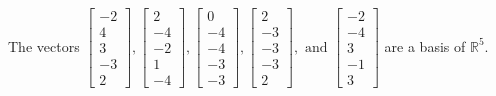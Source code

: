 \begin{exercise}
\begin{exerciseStatement}
  \end{exerciseStatement}
  \begin{exerciseAnswer}
   The vectors \(\left[\begin{array}{r}
-2 \\
4 \\
3 \\
-3 \\
2
\end{array}\right] , \left[\begin{array}{r}
2 \\
-4 \\
-2 \\
1 \\
-4
\end{array}\right] , \left[\begin{array}{r}
0 \\
-4 \\
-4 \\
-3 \\
-3
\end{array}\right] , \left[\begin{array}{r}
2 \\
-3 \\
-3 \\
-3 \\
2
\end{array}\right] , \text{ and } \left[\begin{array}{r}
-2 \\
-4 \\
3 \\
-1 \\
3
\end{array}\right]\) 
  	 are  a basis of \(\mathbb{R}^5\).
  


  \end{exerciseAnswer}
\end{exercise}